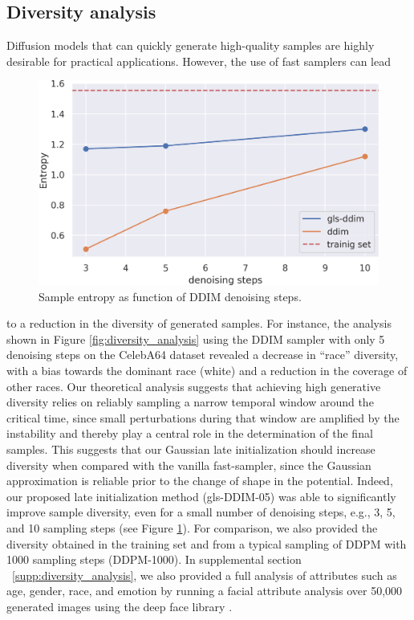 \documentclass{article}
\begin{document}
\subsection{Diversity analysis}
Diffusion models that can quickly generate high-quality samples are highly desirable for practical applications. However, the use of fast samplers can lead
\begin{figure}
    \vspace{-5pt}
    \centering
    \includegraphics[width=\linewidth]{figs/plots/box_plot.png}
    \caption{Sample entropy as function of DDIM denoising steps. }
    \label{fig:plot_diversity}
     \vspace{-12pt}
\end{figure}
to a reduction in the diversity of generated samples. For instance, the analysis shown in Figure \ref{fig:diversity_analysis} using the DDIM sampler with only 5 denoising steps on the CelebA64 dataset revealed a decrease in ``race'' diversity, with a bias towards the dominant race (white) and a reduction in the coverage of other races. Our theoretical analysis suggests that achieving high generative diversity relies on reliably sampling a narrow temporal window around the critical time, since small perturbations during that window are amplified by the instability and thereby play a central role in the determination of the final samples. This suggests that our Gaussian late initialization should increase diversity when compared with the vanilla fast-sampler, since the Gaussian approximation is reliable prior to the change of shape in the potential. Indeed, our proposed late initialization method (gls-DDIM-05) was able to significantly improve sample diversity, even for a small number of denoising steps, e.g., 3, 5, and 10 sampling steps (see Figure \ref{fig:plot_diversity}). For comparison, we also provided the diversity obtained in the training set and from a typical sampling of DDPM with 1000 sampling steps (DDPM-1000). In supplemental section ~\ref{supp:diversity_analysis}, we also provided a full analysis of attributes such as age, gender, race, and emotion  by running a facial attribute analysis over 50,000 generated images using the deep face library \citep{serengil2020lightface}.
\end{document}
